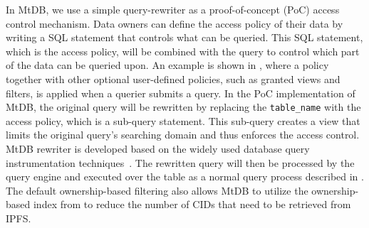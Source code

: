 \documentclass[conference]{IEEEtran}
\newcommand{\seokki}[1]{ {\color{orange}{#1}}}
\newcommand{\ours}{\xspace MtDB\xspace}
\begin{document}
In \ours, we use a simple query-rewriter as a proof-of-concept (PoC) access control mechanism. 
Data owners can define the access policy of their data by writing a SQL statement that controls what can be queried. This SQL statement, which is the access policy, will be combined with the query to control which part of the data can be queried upon.
An example is shown in , where a policy together with other optional user-defined policies, such as granted views and filters, is applied when a querier %
submits a query.
In the PoC implementation of \ours, the original query will be rewritten by replacing the \texttt{table\_name} with the access policy, which is 
a sub-query statement.  %
This sub-query creates a view that limits the original query's searching domain and thus enforces the access control. 
\ours rewriter is developed based on the widely used database query instrumentation techniques~\cite{GA09,LL18j,turnau2023provenance}.
The rewritten query will then be processed by the query engine and executed over the table as a normal query process described in .
The default ownership-based filtering also allows \ours to utilize the ownership-based index from  to reduce the number of CIDs that need to be retrieved from IPFS.
\end{document}
